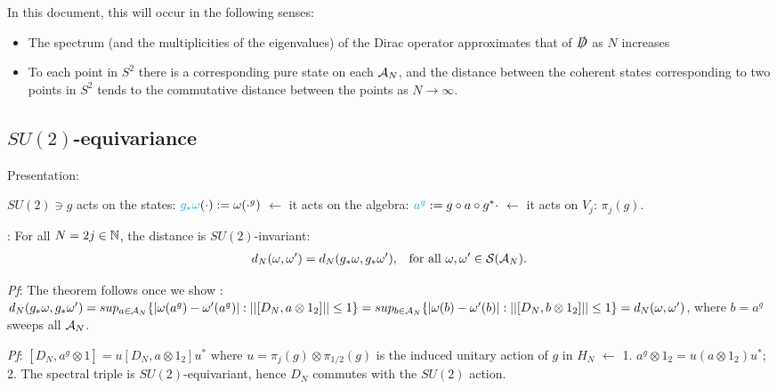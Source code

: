 In this document, this will occur in the following senses:

    \begin{itemize}
    
    \item The spectrum (and the multiplicities of the eigenvalues) of the Dirac operator approximates that of $\slashed D$ as $N$ increases
    
    \item To each point in $S^2$ there is a corresponding pure state on each $\mathcal A_N$, and the distance between the coherent states corresponding to two points in $S^2$ tends to the commutative distance between the points as $N \to \infty$.
    
    \end{itemize}

\subsection{$SU(2)$-equivariance}

{\color{gray}
Presentation:

$SU(2) \ni g$ acts on the states: $\textcolor{cyan}{g_*\omega}(\cdot) := \omega(\cdot^g)$ $\longleftarrow$ it acts on the algebra: $\textcolor{cyan}{a^g}:= g\circ a \circ g^* \cdot$ $\longleftarrow$ it acts on $V_j$: $\pi_j(g)$.

\textbf{}: For all $N = 2j \in \mathbb{N}$, the distance is $SU(2)$-invariant: 
\begin{align}
    d_N(\omega, \omega') &= d_N(g_* \omega, g_*\omega'), & \text{for all $\omega, \omega' \in \mathcal S(\mathcal A_N)$}.
\end{align}

\textit{Pf}: The theorem follows once we show 
    \rtext{$||[D_N, a^g]|| = ||[D_N, a]||$}:
$d_N(g_* \omega, g_* \omega') = sup_{a \in \mathcal A_N}\{ |\omega(a^g) - \omega'(a^g)|: ||[D_N, a \otimes 1_2]|| \leq 1 \} = sup_{b \in \mathcal A_N}\{ |\omega(b) - \omega'(b)|: ||[D_N, b \otimes 1_2]|| \leq 1 \} = d_N(\omega, \omega')$, where $b = a^g$ sweeps all $\mathcal A_N$.

\textit{Pf}: $[D_N, a^g \otimes 1] = u[D_N, a \otimes 1_2]u^*$ where $u = \pi_j(g) \otimes \pi_{1/2}(g)$ is the induced unitary action of $g$ in $H_N$ $\xleftarrow{}$
1. $a^g \otimes 1_2 = u(a \otimes 1_2)u^*$;
2. The spectral triple is $SU(2)$-equivariant, hence $D_N$ commutes with the $SU(2)$ action.
}

